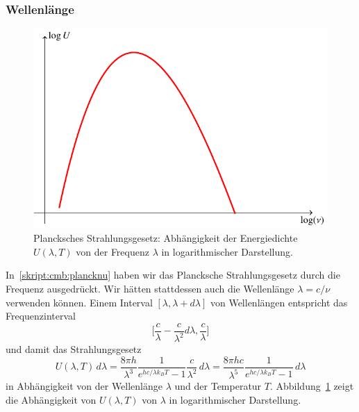 \subsubsection{Wellenlänge}
\begin{figure}
\centering
\includegraphics{chapters/tikz/planck2.pdf}
\caption{Plancksches Strahlungsgesetz: Abhängigkeit der Energiedichte
$U(\lambda,T)$ von der Frequenz $\lambda$ in logarithmischer Darstellung.
\label{skript:cmb:planckUlambda}}
\end{figure}
In~\eqref{skript:cmb:plancknu} haben wir das Plancksche Strahlungsgesetz
durch die Frequenz ausgedrückt.
Wir hätten stattdessen auch die Wellenlänge $\lambda=c/\nu$ verwenden 
können.
Einem Interval $[\lambda,\lambda+d\lambda]$ von Wellenlängen entspricht
das Frequenzinterval
\[
\biggl[
\frac{c}{\lambda}-\frac{c}{\lambda^2}d\lambda
,
\frac{c}{\lambda}
\biggr]
\]
und damit das Strahlungsgesetz
\begin{equation}
U(\lambda,T)\,d\lambda
=
\frac{8\pi h}{\lambda^3}\frac{1}{e^{hc/\lambda k_BT}-1}\frac{c}{\lambda^2}\,d\lambda
=
\frac{8\pi hc}{\lambda^5}\frac{1}{e^{hc/\lambda k_BT}-1}\,d\lambda
\label{skript:cmb:planck:lambda}
\end{equation}
in Abhängigkeit von der Wellenlänge $\lambda$ und der Temperatur $T$.
Abbildung~\ref{skript:cmb:planckUlambda} zeigt die Abhängigkeit von
$U(\lambda,T)$ von $\lambda$ in logarithmischer Darstellung.

